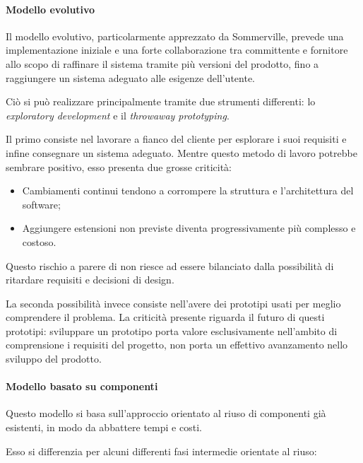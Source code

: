 			\paragraph{Modello evolutivo}

			Il modello evolutivo, particolarmente apprezzato da Sommerville, prevede una implementazione iniziale e una forte collaborazione tra committente e fornitore allo scopo di raffinare il sistema tramite più versioni del prodotto, fino a raggiungere un sistema adeguato alle esigenze dell'utente.

Ciò si può realizzare principalmente tramite due strumenti differenti: lo \emph{exploratory development} e il \emph{throwaway prototyping}.

Il primo consiste nel lavorare a fianco del cliente per esplorare i suoi requisiti e infine consegnare un sistema adeguato. Mentre questo metodo di lavoro potrebbe sembrare positivo, esso presenta due grosse criticità: 
\begin{itemize}
\item Cambiamenti continui tendono a corrompere la struttura e l'architettura del software;
\item Aggiungere estensioni non previste diventa progressivamente più complesso e costoso. 
\end{itemize}
Questo rischio a parere di \hx{} non riesce ad essere bilanciato dalla possibilità di ritardare requisiti e decisioni di design.

La seconda possibilità invece consiste nell'avere dei prototipi usati per meglio comprendere il problema. La criticità presente riguarda il futuro di questi prototipi: sviluppare un prototipo porta valore esclusivamente nell'ambito di comprensione i requisiti del progetto, non porta un effettivo avanzamento nello sviluppo del prodotto.

			\paragraph{Modello basato su componenti}
Questo modello si basa sull'approccio orientato al riuso di componenti già esistenti, in modo da abbattere tempi e costi.

Esso si differenzia per alcuni differenti fasi intermedie orientate al riuso:


